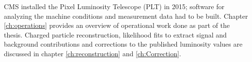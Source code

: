 CMS installed the Pixel Luminosity Telescope (PLT) in 2015; software for analyzing the machine conditions and measurement data had to be built. Chapter \ref{ch:operations} provides an overview of operational work done as part of the thesis. Charged particle reconstruction, likelihood fits to extract signal and background contributions and corrections to the published luminosity values are discussed in chapter \ref{ch:reconstruction} and \ref{ch:Correction}. 


 



